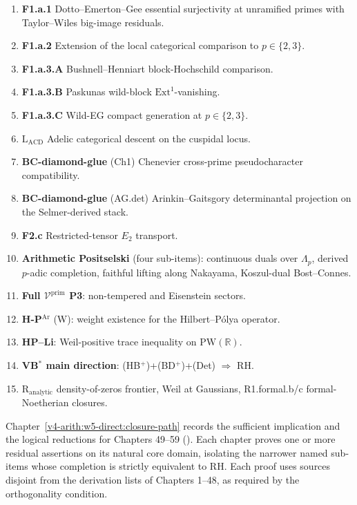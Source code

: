\begin{enumerate}
\item \textbf{F1.a.1} Dotto--Emerton--Gee essential surjectivity at
unramified primes with Taylor--Wiles big-image residuals.
\item \textbf{F1.a.2} Extension of the local categorical comparison
to \(p\in\{2,3\}\).
\item \textbf{F1.a.3.A} Bushnell--Henniart block-Hochschild
comparison.
\item \textbf{F1.a.3.B} Paskunas wild-block
\(\mathrm{Ext}^{1}\)-vanishing.
\item \textbf{F1.a.3.C} Wild-EG compact generation at \(p\in\{2,3\}\).
\item \textbf{\(\mathrm{L}_{\mathrm{ACD}}\)} Adelic categorical descent
on the cuspidal locus.
\item \textbf{BC-diamond-glue} (Ch1) Chenevier cross-prime
pseudocharacter compatibility.
\item \textbf{BC-diamond-glue} (AG.det) Arinkin--Gaitsgory
determinantal projection on the Selmer-derived stack.
\item \textbf{F2.c} Restricted-tensor \(E_{2}\) transport.
\item \textbf{Arithmetic Positselski} (four sub-items): continuous
duals over \(\Lambda_{p}\), derived \(p\)-adic completion, faithful
lifting along Nakayama, Koszul-dual Bost--Connes.
\item \textbf{Full \(\mathcal{V}^{\mathrm{prim}}\) P3}:
non-tempered and Eisenstein sectors.
\item \textbf{H-P\(^{\mathrm{Ar}}\)} (W): weight existence for the
Hilbert--P\'olya operator.
\item \textbf{HP--Li}: Weil-positive trace inequality on
\(\mathrm{PW}(\mathbb{R})\).
\item \textbf{VB\(^{*}\) main direction}: (HB\(^{+}\))+(BD\(^{+}\))+(Det)
\(\Rightarrow\) RH.
\item \textbf{\(\mathrm{R}_{\mathrm{analytic}}\)} density-of-zeros
frontier, Weil at Gaussians, R1.formal.b/c formal-Noetherian
closures.
\end{enumerate}

Chapter~\ref{v4-arith:w5-direct:closure-path} records the
sufficient implication and the logical reductions for
Chapters 49--59 ().
Each chapter proves one or more residual assertions on its natural
core domain, isolating the narrower named sub-items whose completion
is strictly equivalent to RH. Each proof uses sources disjoint from
the derivation lists of Chapters 1--48, as required by the
orthogonality condition.

